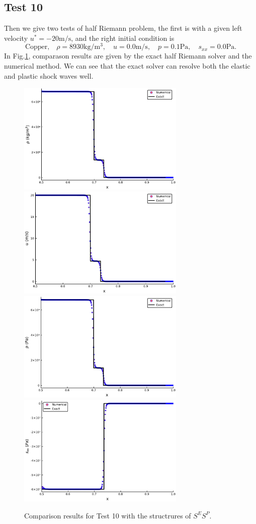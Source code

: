 \documentclass{article}
\numberwithin{equation}{section}
\numberwithin{table}{section}
\begin{document}
\subsection{Test 10}
Then we give two tests of  half Riemann problem, the first is with a given left velocity $u^* = -20\text{m/s}$, and the right initial condition is
\begin{equation}
 \text{Copper,}\quad\rho = 8930\text{kg}/\text{m}^3, \quad  u = 0.0\text{m}/\text{s}, \quad  p =0.1\text{Pa}, \quad  s_{xx}=0.0\text{Pa}.
\end{equation}
In Fig.\ref{fig:case9}, comparason results are given by the exact half Riemann solver and the numerical method. We can see that the exact solver  can resolve both the elastic and plastic shock waves well.
\begin{figure}
  \centering
  \includegraphics[width= 8cm] {case10rho.pdf}
  \includegraphics[width= 8cm] {case10u.pdf}
  \includegraphics[width= 8cm] {case10p.pdf}
  \includegraphics[width= 8cm] {case10sxx.pdf}

    \caption{Comparison results for Test 10 with the structrures of $S^ES^P$.  }
  \label{fig:case9}
\end{figure}
\end{document}
